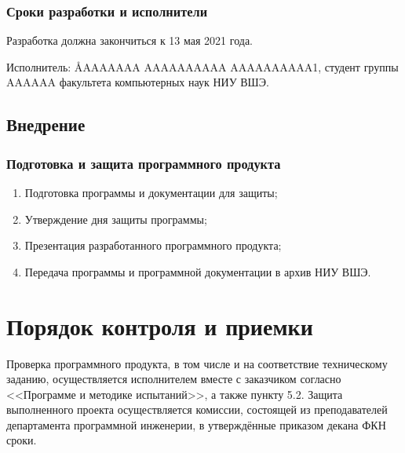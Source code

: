 \documentclass[a4paper,12pt,reqno]{article}
\begin{document}
      \subsubsection*{Сроки разработки и исполнители}
      Разработка должна закончиться к 13 мая 2021 года.

      Исполнитель: \AA{AAAAAAA AAAAAAAAAA AAAAAAAAAA}{1}, студент группы AAAAAA факультета компьютерных наук НИУ ВШЭ.
    \subsection{Внедрение}
      \subsubsection*{Подготовка и защита программного продукта}
      \begin{enumerate}
        \item Подготовка программы и документации для защиты;
        \item Утверждение дня защиты программы;
        \item Презентация разработанного программного продукта;
        \item Передача программы и программной документации в архив НИУ ВШЭ.
      \end{enumerate}




  \section{Порядок контроля и приемки}
  Проверка программного продукта, в том числе и на соответствие техническому заданию,
  осуществляется исполнителем вместе с заказчиком согласно <<Программе и методике испытаний>>, а также пункту 5.2.
  Защита выполненного проекта осуществляется комиссии, состоящей из преподавателей департамента программной инженерии,
  в утверждённые приказом декана ФКН сроки.

  \begin{CRTbibliography}
  \end{CRTbibliography}

  \CRTlistRegistration
\end{document}
